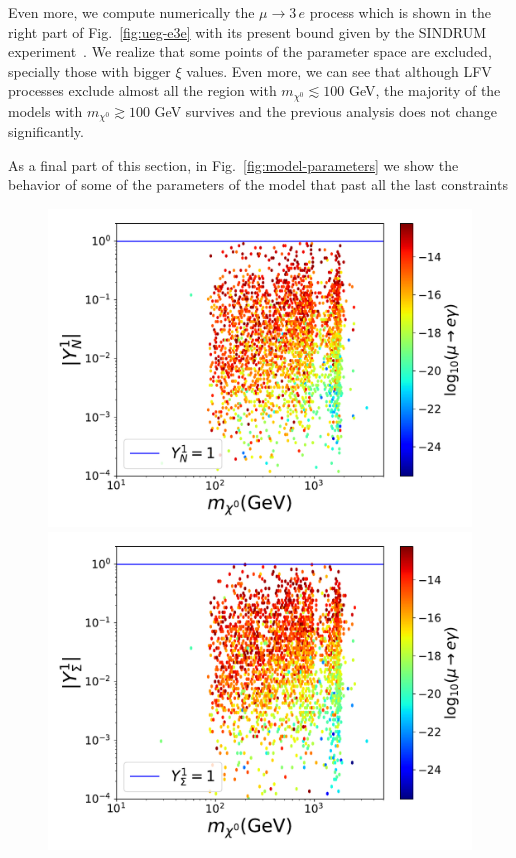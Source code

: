\documentclass[12pt,letterpaper]{article}
\begin{document}
Even more, we compute numerically the $\mu\rightarrow 3\,e$ process which is shown in the right part of Fig.~\ref{fig:ueg-e3e} with its present bound given by the SINDRUM experiment~\cite{Bertl:1985mw}.
We realize that some points of the parameter space are excluded, specially those with bigger $\xi$ values. Even more, we can see that although LFV processes exclude almost all the region with $m_{\chi^0}\lesssim 100$ GeV, the majority of the models with $m_{\chi^0} \gtrsim 100$ GeV survives and the previous analysis does not change significantly. 

As a final part of this section, in Fig.~\ref{fig:model-parameters} we show the behavior of some of the parameters of the model that past all the last constraints
%
\begin{figure}
\begin{center}
\includegraphics[scale=0.4]{YN1}
\includegraphics[scale=0.4]{YTF1}

\end{center}
\end{figure}
\end{document}
